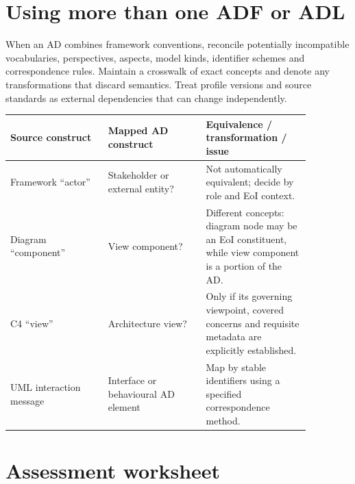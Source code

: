 \documentclass[11pt,letterpaper]{article}
\begin{document}
\section{Using more than one ADF or ADL}
\begin{Guidance}When an AD combines framework conventions, reconcile potentially incompatible vocabularies, perspectives, aspects, model kinds, identifier schemes and correspondence rules. Maintain a crosswalk of exact concepts and denote any transformations that discard semantics. Treat profile versions and source standards as external dependencies that can change independently.\end{Guidance}
\begin{longtable}{p{0.28\linewidth}p{0.29\linewidth}p{0.30\linewidth}}\toprule\textbf{Source construct}&\textbf{Mapped AD construct}&\textbf{Equivalence / transformation / issue}\\\midrule\endhead
Framework ``actor''&Stakeholder or external entity?&Not automatically equivalent; decide by role and EoI context.\\
Diagram ``component''&View component?&Different concepts: diagram node may be an EoI constituent, while view component is a portion of the AD.\\
C4 ``view''&Architecture view?&Only if its governing viewpoint, covered concerns and requisite metadata are explicitly established.\\
UML interaction message&Interface or behavioural AD element&Map by stable identifiers using a specified correspondence method.\\\bottomrule\end{longtable}
\section{Assessment worksheet}
\LegalFooter
\end{document}
